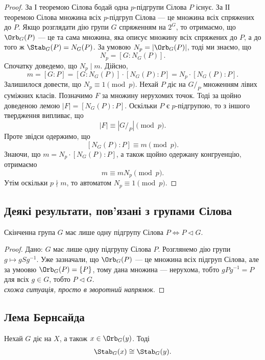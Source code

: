 \documentclass{math_library}
\begin{document}
\begin{proof}
За І теоремою Сілова бодай одна $p$-підгрупи Сілова $P$ існує. За ІІ теоремою Сілова множина всіх $p$-підгруп Сілова --- це множина всіх спряжених до $P$. Якщо розглядати дію групи $G$ спряженням на $2^G$, то отримаємо, що $\Orb_G(P)$ --- це та сама множина, яка описує множину всіх спряжених до $P$, а до того ж $\Stab_G(P) = N_G(P)$. За умовою $N_p = |\Orb_G(P)|$, тоді ми знаємо, що
\[ 
N_p = [G: N_G(P)].
\]
Спочатку доведемо, що $N_p \mid m$. Дійсно,
\[
m = [G:P] = [G:N_G(P)] \cdot [N_G(P) : P] = N_p \cdot [N_G(P) : P].
\]
Залишилося довести, що $N_p \equiv 1 \pmod p$. Нехай $P$ діє на $G/_P$ множенням лівих суміжних класів. Позначимо $F$ за множину нерухомих точок. Тоді за щойно доведеною лемою $|F| = [N_G(P) : P]$. Оскільки $P$ є $p$-підгрупою, то з іншого твердження випливає, що 
\[
|F| \equiv |G/_P| \pmod p.
\]
Проте звідси одержимо, що
\[
[N_G(P) : P] \equiv m \pmod p.
\]
Знаючи, що $m = N_p \cdot [N_G(P):P]$, а також щойно одержану конгруенцію, отримаємо
\[
m \equiv m N_p \pmod p.
\]
Утім оскільки $p \nmid m$, то автоматом $N_p \equiv 1 \pmod p$.
\end{proof}

\subsection{Деякі результати, пов'язані з групами Сілова}
\begin{proposition}
Скінченна група $G$ має лише одну підгрупу Сілова $P \iff P \triangleleft G$.
\end{proposition}

\begin{proof}
\rightproof Дано: $G$ має лише одну підгрупу Сілова $P$. Розглянемо дію групи $g \mapsto gSg^{-1}$. Уже зазначали, що $\Orb_G(P)$ --- це множина всіх підгруп Сілова, але за умоовю $\Orb_G(P) = \{P\}$, тому дана множина --- нерухома, тобто $gPg^{-1} = P$ для всіх $g \in G$, тобто $P \triangleleft G$.
\bigskip \\
\leftproof \textit{схожа ситуація, просто в зворотний напрямок}.
\end{proof}

\subsection{Лема Бернсайда}
\begin{lemma}
Нехай $G$ діє на $X$, а також $x \in \Orb_G(y)$. Тоді
\begin{align*}
\Stab_G(x) \cong \Stab_G(y).
\end{align*}
\end{lemma}
\end{document}
